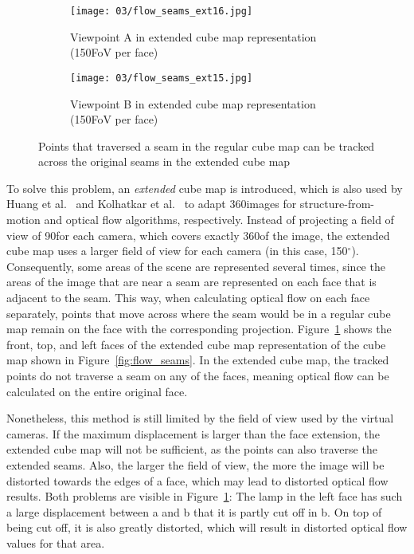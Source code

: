 \begin{figure}[p]
\centering
    \hfill
    \begin{subfigure}[t]{0.45\textwidth}            
            \centering
            \texttt{[image: 03/flow\_seams\_ext16.jpg]}
            \caption{Viewpoint A in extended cube map representation (150\degree FoV per face)}
    \end{subfigure}%
    \hfill
    \begin{subfigure}[t]{0.45\textwidth}
            \centering
            \texttt{[image: 03/flow\_seams\_ext15.jpg]}
            \caption{Viewpoint B in extended cube map representation (150\degree FoV per face)}
    \end{subfigure}
    \hfill
    \hfill
  \caption[Tracking points across seams in the extended cube map]{Points that traversed a seam in the regular cube map can be tracked across the original seams in the extended cube map} \label{fig:flow_seams_ext}
\end{figure}

To solve this problem, an \emph{extended} cube map is introduced, which is also used by Huang et al.\ \cite{6dof} and Kolhatkar et al.\ \cite{360flowblending} to adapt 360\degree images for structure-from-motion and optical flow algorithms, respectively. Instead of projecting a field of view of 90\degree for each camera, which covers exactly 360\degree of the image, the extended cube map uses a larger field of view for each camera (in this case, 150$^{\circ}$). Consequently, some areas of the scene are represented several times, since the areas of the image that are near a seam are represented on each face that is adjacent to the seam. This way, when calculating optical flow on each face separately, points that move across where the seam would be in a regular cube map remain on the face with the corresponding projection. Figure~\ref{fig:flow_seams_ext} shows the front, top, and left faces of the extended cube map representation of the cube map shown in Figure~\ref{fig:flow_seams}. In the extended cube map, the tracked points do not traverse a seam on any of the faces, meaning optical flow can be calculated on the entire original face.

Nonetheless, this method is still limited by the field of view used by the virtual cameras. If the maximum displacement is larger than the face extension, the extended cube map will not be sufficient, as the points can also traverse the extended seams. Also, the larger the field of view, the more the image will be distorted towards the edges of a face, which may lead to distorted optical flow results. Both problems are visible in Figure~\ref{fig:flow_seams_ext}: The lamp in the left face has such a large displacement between a and b that it is partly cut off in b. On top of being cut off, it is also greatly distorted, which will result in distorted optical flow values for that area.

